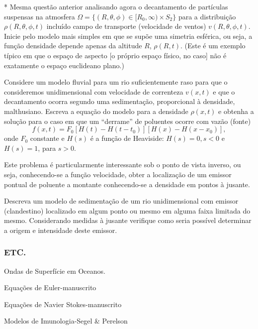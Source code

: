 {\begin{exercise}
* Mesma questão anterior analisando agora o decantamento de partículas suspensas na atmosfera \(\Omega = \{(R, \theta, \phi) \in [R_0, \infty) \times S_2\}\) para a distribuição \(\rho(R, \theta, \phi, t)\) incluído campo de transporte (velocidade de ventos) \(v(R, \theta, \phi, t)\). Inicie pelo modelo mais simples em que se supõe uma simetria esférica, ou seja, a função densidade depende apenas da altitude \(R\), \(\rho(R, t)\). (Este é um exemplo típico em que o espaço de aspecto [o próprio espaço físico, no caso] não é exatamente o espaço euclideano plano.)
\end{exercise}


\begin{exercise}
Considere um modelo fluvial para um rio suficientemente raso para que o consideremos unidimensional com velocidade de correnteza \(v(x,t)\) e que o decantamento ocorra segundo uma sedimentação, proporcional à densidade, malthusiano. Escreva a equação do modelo para a densidade \(\rho(x,t)\) e obtenha a solução para o caso em que um ``derrame'' de poluentes ocorre com vazão (fonte)
\[f(x,t) = F_0 [H(t) - H(t - t_0)] [H(x) - H(x - x_0)],\]
onde \(F_0\) constante e \(H(s)\) é a função de Heaviside: \(H(s) = 0, s < 0\) e \(H(s) = 1\), para \(s > 0\).

Este problema é particularmente interessante sob o ponto de vista inverso, ou seja, conhecendo-se a função velocidade, obter a localização de um emissor pontual de poluente a montante conhecendo-se a densidade em pontos à jusante.
\end{exercise}

\begin{exercise}
Descreva um modelo de sedimentação de um rio unidimensional com emissor (clandestino) localizado em algum ponto ou mesmo em alguma faixa limitada do mesmo. Considerando medidas à jusante verifique como seria possível determinar a origem e intensidade deste emissor.
\end{exercise}
}

\subsubsection{ETC.}

\begin{description}
\item Ondas de Superfície em Oceanos.
\item Equações de Euler-manuscrito
\item Equações de Navier Stokes-manuscrito
\item Modelos de Imunologia-Segel \& Perelson
\end{description}


